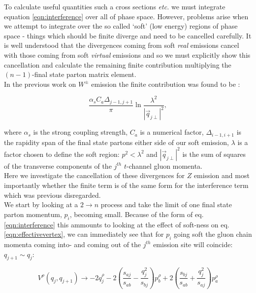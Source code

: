 		To calculate useful quantities such a cross sections \emph{etc.} we must integrate equation
		\eqref{eqn:interference} over all of phase space.  However, problems arise when we attempt to
		integrate over the so called `soft' (low energy) regions of phase space - things which should
		be finite diverge and need to be cancelled carefully.  It is well understood that the divergences
		coming from soft \emph{real} emissions cancel with those coming from soft \emph{virtual} emissions
		and so we must explicitly show this cancellation and calculate the remaining finite contribution
		multiplying the $(n-1)$-final state parton matrix element.\\In the previous work on $W^\pm$
		emission the finite contribution was found to be \cite{JeppeHiggs}\cite{Constructing}:

		\begin{equation}
			\frac{\alpha_s C_a \Delta_{j-1, j+1}}{\pi}\ln{\frac{\lambda^2}{|\vec{q}_{j\perp}|^2}},
		\end{equation}

		where $\alpha_s$ is the strong coupling strength, $C_a$ is a numerical factor, $\Delta_{i-1, i+1}$
		is the rapidity span of the final state partons either side of our soft emission, $\lambda$ is a
		factor chosen to define the soft region: $p^2 < \lambda^2$ and $|\vec{q}_{j\perp}|^2$ is the sum of
		squares of the transverse components of the $j^{th}$ $t$-channel gluon momenta.\\Here we investigate
		the cancellation of these divergences for $Z$ emission and most importantly whether the finite term
		is of the same form for the interference term which was previous disregarded.\\We start by looking
		at a $2\rightarrow n$ process and take the limit of one final state parton momentum, $p_i$, becoming
		small.  Because of the form of eq. \eqref{eqn:interference} this ammounts to looking at the
		effect of soft-ness on eq. \eqref{eqn:effectivevertex}, we can immediately see that for $p_i$
		going soft the gluon chain momenta coming into- and coming out of the $j^{th}$ emission site will
		coincide: $q_{j+1}\sim q_j$:

		\begin{equation}
			V^\rho(q_j, q_{j+1}) \rightarrow -2q_j^\rho - 2\left(\frac{s_{aj}}{s_{ab}} -
				\frac{q^2_{j}}{s_{bj}}\right)p_b^\rho + 2\left(\frac{s_{bj}}{s_{ab}} +
				\frac{q_j^2}{s_{aj}}\right)p_a^\rho
				\label{eqn:vertexlimit}
		\end{equation}

